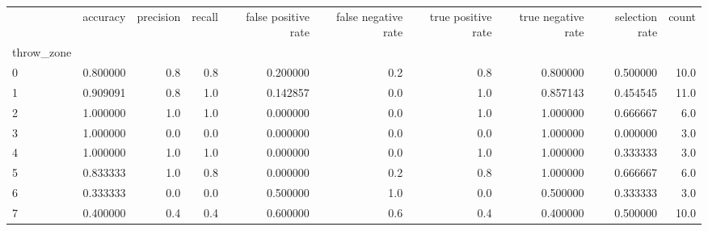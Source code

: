 \begin{tabular}{lrrrrrrrrr}
\toprule
{} &  accuracy &  precision &  recall &  false positive rate &  false negative rate &  true positive rate &  true negative rate &  selection rate &  count \\
throw\_zone &           &            &         &                      &                      &                     &                     &                 &        \\
\midrule
0          &  0.800000 &        0.8 &     0.8 &             0.200000 &                  0.2 &                 0.8 &            0.800000 &        0.500000 &   10.0 \\
1          &  0.909091 &        0.8 &     1.0 &             0.142857 &                  0.0 &                 1.0 &            0.857143 &        0.454545 &   11.0 \\
2          &  1.000000 &        1.0 &     1.0 &             0.000000 &                  0.0 &                 1.0 &            1.000000 &        0.666667 &    6.0 \\
3          &  1.000000 &        0.0 &     0.0 &             0.000000 &                  0.0 &                 0.0 &            1.000000 &        0.000000 &    3.0 \\
4          &  1.000000 &        1.0 &     1.0 &             0.000000 &                  0.0 &                 1.0 &            1.000000 &        0.333333 &    3.0 \\
5          &  0.833333 &        1.0 &     0.8 &             0.000000 &                  0.2 &                 0.8 &            1.000000 &        0.666667 &    6.0 \\
6          &  0.333333 &        0.0 &     0.0 &             0.500000 &                  1.0 &                 0.0 &            0.500000 &        0.333333 &    3.0 \\
7          &  0.400000 &        0.4 &     0.4 &             0.600000 &                  0.6 &                 0.4 &            0.400000 &        0.500000 &   10.0 \\
\bottomrule
\end{tabular}
